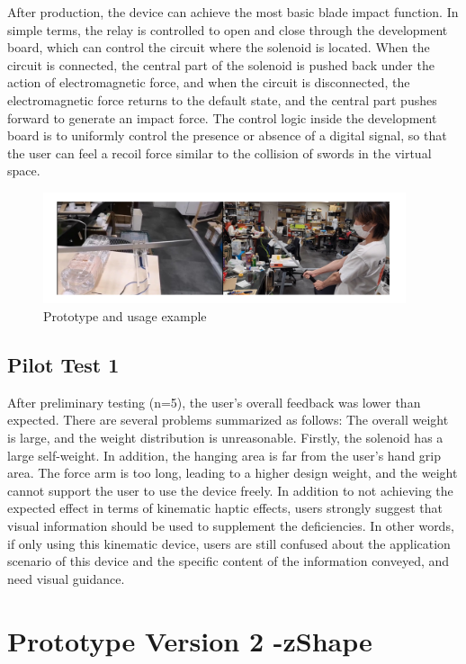 After production, the device can achieve the most basic blade impact function. In simple terms, the relay is controlled to open and close through the development board, which can control the circuit where the solenoid is located. When the circuit is connected, the central part of the solenoid is pushed back under the action of electromagnetic force, and when the circuit is disconnected, the electromagnetic force returns to the default state, and the central part pushes forward to generate an impact force. The control logic inside the development board is to uniformly control the presence or absence of a digital signal, so that the user can feel a recoil force similar to the collision of swords in the virtual space.

\begin{figure}[h]
\centering
\includegraphics[width=0.95\textwidth]{A_thesis/figures/022.png}
\caption{Prototype and usage example}
\end{figure}


\subsection{Pilot Test 1}
After preliminary testing (n=5), the user's overall feedback was lower than expected.
There are several problems summarized as follows:
The overall weight is large, and the weight distribution is unreasonable. Firstly, the solenoid has a large self-weight. In addition, the hanging area is far from the user's hand grip area. The force arm is too long, leading to a higher design weight, and the weight cannot support the user to use the device freely. 
In addition to not achieving the expected effect in terms of kinematic haptic effects, users strongly suggest that visual information should be used to supplement the deficiencies. In other words, if only using this kinematic device, users are still confused about the application scenario of this device and the specific content of the information conveyed, and need visual guidance.

\section{Prototype Version 2 -zShape}
